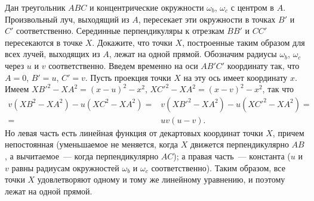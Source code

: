 \problem{}
Дан треугольник $ABC$ и концентрические окружности $\omega_b$, $\omega_c$ с
центром в $A$.
Произвольный луч, выходящий из $A$, пересекает эти окружности в точках $B'$ и
$C'$ соответственно.
Серединные перпендикуляры к отрезкам $BB'$ и $CC'$ пересекаются в точке $X$.
Докажите, что точки $X$, построенные таким образом для всех лучей, выходящих из
$A$, лежат на одной прямой.
\solution
Обозначим радиусы $\omega_b$, $\omega_c$ через $u$ и $v$ соответственно.
Введем временно на оси $AB'C'$ координату так, что $A = 0$, $B' = u$, $C' = v$.
Пусть проекция точки $X$ на эту ось имеет координату $x$.
Имеем
$XB'^2 - XA^2 = (x - u)^2 - x^2$,
$XC'^2 - XA^2 = (x - v)^2 - x^2$,
так что 
\begin{align*}
    v (XB^2 - XA^2) - u (XC^2 - XA^2)
={}&
    v (XB'^2 - XA^2) - u (XC'^2 - XA^2)
=\\={}&
    u v (u - v)
.\end{align*}
Но левая часть есть линейная функция от декартовых координат точки $X$, причем
непостоянная (уменьшаемое не меняется, когда $X$ движется перпендикулярно $AB$,
а вычитаемое~--- когда перпендикулярно $AC$);
а правая часть~--- константа ($u$ и $v$ равны радиусам окружностей $\omega_b$ и
$\omega_c$ соответственно).
Таким образом, все точки $X$ удовлетворяют одному и тому же линейному
уравнению, и поэтому лежат на одной прямой.
\endproblem
